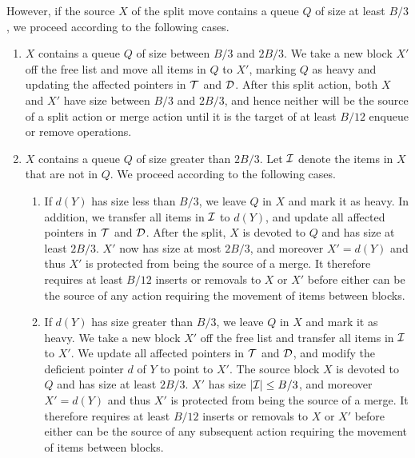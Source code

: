 \documentclass[11pt,letterpaper]{article}
\begin{document}
However, if the source $X$ of the split move contains a queue $Q$ of size at least $B/3$, we proceed according to the following cases.
\begin{enumerate}
\item $X$ contains a queue $Q$ of size between $B/3$ and $2B/3$. We take a new block $X'$ off the free list and move all items in $Q$
to $X'$, marking $Q$ as heavy and updating the affected pointers in $\cal T$ and $\cal D$. After this split action, both $X$ and $X'$ have size between $B/3$ and $2B/3$, and hence neither will be the source of a split action or merge action until it is the target of at least $B/12$ enqueue or remove operations. 
\item $X$ contains a queue $Q$ of size greater than $2B/3$. Let $\cal I$ denote the items in $X$ that are not in $Q$. We proceed according to the following cases.
	\begin{enumerate} \item If $d(Y)$ has size less than $B/3$, we leave $Q$ in $X$ and mark it as heavy. In addition, we transfer all items in $\cal I$ to $d(Y)$, and update all affected pointers in $\cal T$ and $\cal D$. After the split, $X$ is devoted to $Q$ and has size at least $2B/3$. $X'$ now has size at most $2B/3$, and moreover $X'=d(Y)$ and thus $X'$ is protected from being the source of a merge. It therefore requires at least $B/12$ inserts or removals to $X$ or $X'$ before either can be the source of any action requiring the movement of items between blocks.
	\item  If $d(Y)$ has size greater than $B/3$, we leave $Q$ in $X$ and mark it as heavy. We take a new block $X'$ off the free list and transfer all items in $\cal I$ to $X'$. We update all affected pointers in $\cal T$ and $\cal D$, and modify the deficient pointer $d$ of $Y$ to point to $X'$. The source block $X$ is devoted to $Q$ and has size at least $2B/3$. $X'$ has size $|{\cal I}|\leq B/3$, and moreover $X'=d(Y)$ and thus $X'$ is protected from being the source of a merge. It therefore requires at least $B/12$ inserts or removals to $X$ or $X'$ before either can be the source of any subsequent action requiring the movement of items between blocks.  \end{enumerate}
\end{enumerate}
\end{document}
